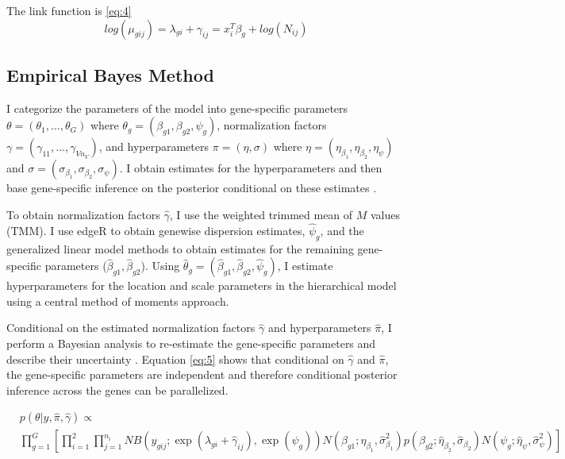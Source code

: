 \documentclass[11pt]{isuthesis}
\begin{document}
The link function is \ref{eq:4}
\begin{equation}
\label{eq:4}
log(\mu_{gij}) = \lambda_{gi} + \gamma_{ij} = x_i^T \beta_g + log(N_{ij})
\end{equation}


\subsection{Empirical Bayes Method}

I categorize the parameters of the model into gene-specific parameters $\theta = (\theta_1, ..., \theta_G)$ where $\theta_g = (\beta_{g1}, \beta_{g2}, \psi_g)$, normalization factors $\gamma = (\gamma_{11}, ..., \gamma_{V n_V})$, and hyperparameters $\pi = (\eta, \sigma)$ where $\eta = (\eta_{\beta_1}, \eta_{\beta_2}, \eta_\psi)$ and $\sigma = (\sigma_{\beta_1}, \sigma_{\beta_2}, \sigma_\psi)$. I obtain estimates for the hyperparameters and then base gene-specific inference on the posterior conditional on these estimates \citep{niemi2015empirical}.

To obtain normalization factors $\hat{\gamma}$, I use the weighted trimmed mean of $M$ values (TMM). I use edgeR to obtain genewise dispersion estimates, $\hat{\psi}_g$, and the generalized linear model methods to obtain estimates for the remaining gene-specific parameters ($\hat{\beta}_{g1}, \hat{\beta}_{g2}$)\citep{robinson2010scaling}. Using $\hat{\theta}_g = (\hat{\beta}_{g1} , \hat{\beta}_{g2}, \hat{\psi}_g)$, I estimate hyperparameters for the location and scale parameters in the hierarchical model using a central method of moments approach. 

Conditional on the estimated normalization factors $\hat{\gamma}$ and hyperparameters $\hat{\pi}$, I perform a Bayesian analysis to re-estimate the gene-specific parameters and describe their uncertainty \citep{niemi2015empirical}. Equation \ref{eq:5} shows that conditional on $\hat{\gamma}$ and $\hat{\pi}$, the gene-specific parameters are independent and therefore conditional posterior inference across the genes can be parallelized. 

\begin{equation}
\label{eq:5}
\begin{split}
& p(\theta | y, \hat{\pi}, \hat{\gamma})  \propto \\ & \prod_{g=1}^{G} \left[ \prod_{i=1}^{2} \prod_{j=1}^{n_i} NB(y_{gij} ; \exp(\lambda_{gi} + \hat{\gamma}_{ij}), \exp(\psi_g)) N(\beta_{g1} ; \hat{\eta}_{\beta_1}, \hat{\sigma}^2_{\beta_1}) p(\beta_{g2} ; \hat{\eta}_{\beta_2}, \hat{\sigma}_{\beta_2}) N(\psi_g ; \hat{\eta}_{\psi}, \hat{\sigma}^2_{\psi})  \right]
\end{split}
\end{equation}
\end{document}
